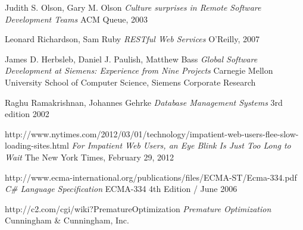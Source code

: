 \begin{thebibliography}{9}

		Judith S. Olson, Gary M. Olson\newline
		\emph{Culture surprises in Remote Software Development Teams}\newline
		ACM Queue, 2003

		Leonard Richardson, Sam Ruby\newline
		\emph{RESTful Web Services}
		O'Reilly, 2007
    
		James D. Herbsleb, Daniel J. Paulish, Matthew Bass\newline
		\emph{Global Software Development at Siemens: Experience from Nine Projects}
		Carnegie Mellon University School of Computer Science,
		Siemens Corporate Research 
	
		Raghu Ramakrishnan, Johannes Gehrke\newline
		\emph{Database Management Systems}\newline
		3rd edition 2002

		http://www.nytimes.com/2012/03/01/technology/impatient-web-users-flee-slow-loading-sites.html\newline
		\emph{For Impatient Web Users, an Eye Blink Is Just Too Long to Wait}\newline
		The New York Times, February 29, 2012

		http://www.ecma-international.org/publications/files/ECMA-ST/Ecma-334.pdf\newline
		\emph{C\# Language Specification }\newline
		ECMA-334 4th Edition / June 2006

		http://c2.com/cgi/wiki?PrematureOptimization\newline
		\emph{Premature Optimization}\newline
		Cunningham \& Cunningham, Inc.

\end{thebibliography}
